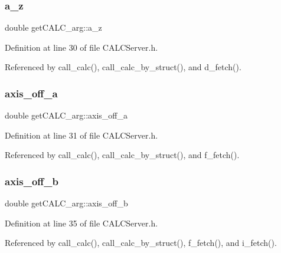 \subsubsection{\texorpdfstring{a\+\_\+z}{a\_z}}
{\footnotesize\ttfamily double get\+C\+A\+L\+C\+\_\+arg\+::a\+\_\+z}



Definition at line 30 of file C\+A\+L\+C\+Server.\+h.



Referenced by call\+\_\+calc(), call\+\_\+calc\+\_\+by\+\_\+struct(), and d\+\_\+fetch().

\mbox{\label{structget_c_a_l_c__arg_aa400a83f5e63b44d71aaa0b4d084d8fe}} 
\subsubsection{\texorpdfstring{axis\+\_\+off\+\_\+a}{axis\_off\_a}}
{\footnotesize\ttfamily double get\+C\+A\+L\+C\+\_\+arg\+::axis\+\_\+off\+\_\+a}



Definition at line 31 of file C\+A\+L\+C\+Server.\+h.



Referenced by call\+\_\+calc(), call\+\_\+calc\+\_\+by\+\_\+struct(), and f\+\_\+fetch().

\mbox{\label{structget_c_a_l_c__arg_a87c945708ea4205ddde105f649804b45}} 
\subsubsection{\texorpdfstring{axis\+\_\+off\+\_\+b}{axis\_off\_b}}
{\footnotesize\ttfamily double get\+C\+A\+L\+C\+\_\+arg\+::axis\+\_\+off\+\_\+b}



Definition at line 35 of file C\+A\+L\+C\+Server.\+h.



Referenced by call\+\_\+calc(), call\+\_\+calc\+\_\+by\+\_\+struct(), f\+\_\+fetch(), and i\+\_\+fetch().

